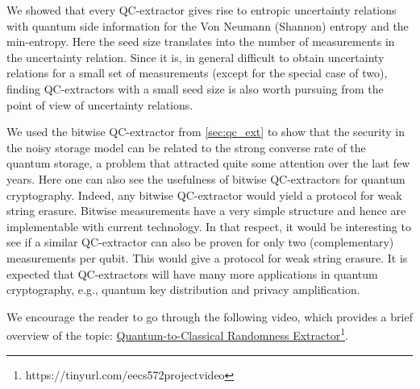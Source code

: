 We showed that every QC-extractor gives rise to entropic uncertainty relations with quantum side information for the Von Neumann (Shannon) entropy and the min-entropy. Here the seed size translates into the number of measurements in the uncertainty relation. Since it is, in general difficult to obtain uncertainty relations for a small set of measurements (except for the special case of two), finding QC-extractors with a small seed size is also worth pursuing from the point of view of uncertainty relations.

We used the bitwise QC-extractor from \autoref{sec:qc_ext} to show that the security in the noisy storage model can be related to the strong converse rate of the quantum storage, a problem that attracted quite some attention over the last few years. Here one can also see the usefulness of bitwise QC-extractors for quantum cryptography. Indeed, any bitwise QC-extractor would yield a protocol for weak string erasure. Bitwise measurements have a very simple structure and hence are implementable with current technology. In that respect, it would be interesting to see if a similar QC-extractor can also be proven for only two (complementary) measurements per qubit. This would give a protocol for weak string erasure. It is expected that QC-extractors will have many more applications in quantum cryptography, e.g., quantum key distribution and privacy amplification.

We encourage the reader to go through the following video, which provides a brief overview of the topic:
\href{https://tinyurl.com/eecs572projectvideo}{Quantum-to-Classical Randomness Extractor\footnote{https://tinyurl.com/eecs572projectvideo}.}